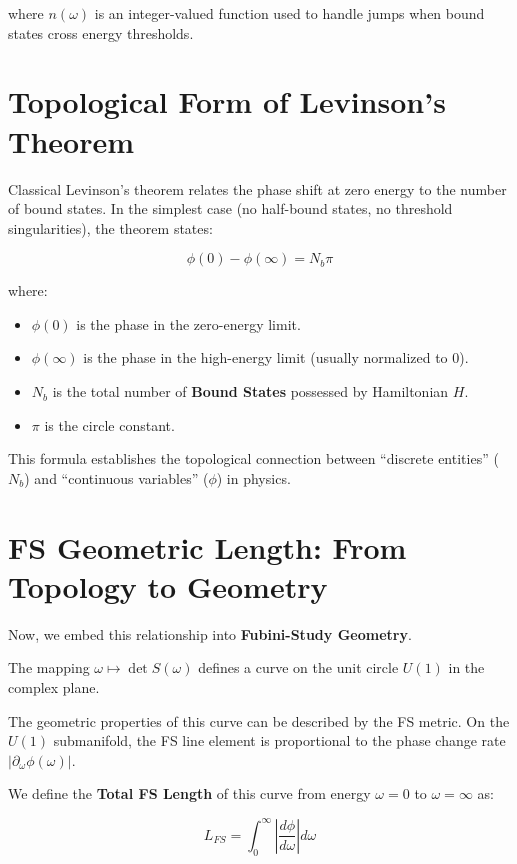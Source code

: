 where $n(\omega)$ is an integer-valued function used to handle jumps when bound states cross energy thresholds.

\section{Topological Form of Levinson's Theorem}

Classical Levinson's theorem relates the phase shift at zero energy to the number of bound states. In the simplest case (no half-bound states, no threshold singularities), the theorem states:

\[\phi(0) - \phi(\infty) = N_b \pi\]

where:

\begin{itemize}
\item $\phi(0)$ is the phase in the zero-energy limit.

\item $\phi(\infty)$ is the phase in the high-energy limit (usually normalized to 0).

\item \textbf{$N_b$} is the total number of \textbf{Bound States} possessed by Hamiltonian $H$.

\item \textbf{$\pi$} is the circle constant.
\end{itemize}

This formula establishes the topological connection between ``discrete entities'' ($N_b$) and ``continuous variables'' ($\phi$) in physics.

\section{FS Geometric Length: From Topology to Geometry}

Now, we embed this relationship into \textbf{Fubini-Study Geometry}.

The mapping $\omega \mapsto \det S(\omega)$ defines a curve on the unit circle $U(1)$ in the complex plane.

The geometric properties of this curve can be described by the FS metric. On the $U(1)$ submanifold, the FS line element is proportional to the phase change rate $|\partial_\omega \phi(\omega)|$.

We define the \textbf{Total FS Length} of this curve from energy $\omega=0$ to $\omega=\infty$ as:

\[L_{FS} = \int_0^{\infty} \left| \frac{d\phi}{d\omega} \right| d\omega\]

